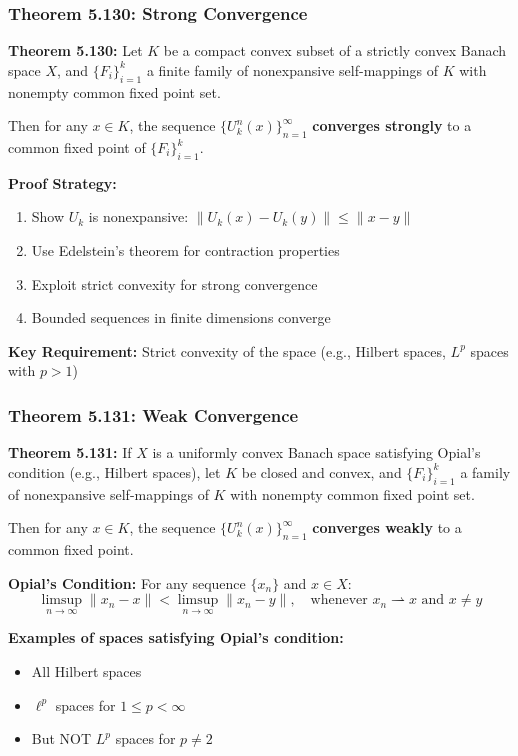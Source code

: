 \documentclass[aspectratio=169,10pt]{beamer}
\begin{document}
\begin{frame}
\frametitle{Theorem 5.130: Strong Convergence}

\textbf{Theorem 5.130:} Let $K$ be a compact convex subset of a strictly convex Banach space $X$,
and $\{F_i\}_{i=1}^k$ a finite family of nonexpansive self-mappings of $K$ with nonempty common fixed point set.

\vspace{0.2cm}

Then for any $x \in K$, the sequence $\{U_k^n(x)\}_{n=1}^{\infty}$ \textbf{converges strongly}
to a common fixed point of $\{F_i\}_{i=1}^k$.

\vspace{0.3cm}

\textbf{Proof Strategy:}
\begin{enumerate}
    \item Show $U_k$ is nonexpansive: $\|U_k(x) - U_k(y)\| \leq \|x - y\|$
    \item Use Edelstein's theorem for contraction properties
    \item Exploit strict convexity for strong convergence
    \item Bounded sequences in finite dimensions converge
\end{enumerate}

\vspace{0.3cm}

\textbf{Key Requirement:} Strict convexity of the space (e.g., Hilbert spaces, $L^p$ spaces with $p > 1$)

\end{frame}

\begin{frame}
\frametitle{Theorem 5.131: Weak Convergence}

\textbf{Theorem 5.131:} If $X$ is a uniformly convex Banach space satisfying Opial's condition
(e.g., Hilbert spaces), let $K$ be closed and convex, and $\{F_i\}_{i=1}^k$ a family of nonexpansive
self-mappings of $K$ with nonempty common fixed point set.

\vspace{0.2cm}

Then for any $x \in K$, the sequence $\{U_k^n(x)\}_{n=1}^{\infty}$ \textbf{converges weakly}
to a common fixed point.

\vspace{0.3cm}

\textbf{Opial's Condition:} For any sequence $\{x_n\}$ and $x \in X$:
$$\limsup_{n \to \infty} \|x_n - x\| < \limsup_{n \to \infty} \|x_n - y\|, \quad \text{whenever } x_n \rightharpoonup x \text{ and } x \neq y$$

\vspace{0.3cm}

\textbf{Examples of spaces satisfying Opial's condition:}
\begin{itemize}
    \item All Hilbert spaces
    \item $\ell^p$ spaces for $1 \leq p < \infty$
    \item But NOT $L^p$ spaces for $p \neq 2$
\end{itemize}

\end{frame}
\end{document}
